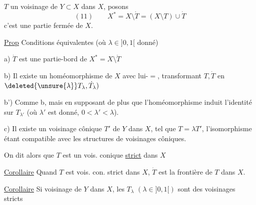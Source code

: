  $T$ un voisinage
 de $Y\subset X$
dans $X$, posons
\[
(11)\qquad X^*=X\setminus\mathring T=(X\setminus T)\cup\dot T
\]
c'est une partie fermée de $X$. 

\uline{Prop} Conditions équivalentes (où $\lambda\in]0,1[$ donné)

a) $\dot T$ est une partie-bord de $X^*=X\setminus\mathring T$

b) Il existe un homéomorphisme de $X$
avec lui-$=$, transformant $T,\dot T$ en
$\deleted{\unsure{\lambda}}T_\lambda,\dot T_\lambda)$

b') Comme b, mais en supposant de plus
que l'homéomorphisme induit l'identité
sur $T_{\lambda'}$ (où 
$\lambda'$ est donné, $0<\lambda'<\lambda$).

c) Il existe un voisinage  cônique $T'$
de $Y$ dans $X$,  tel que $T=\lambda T'$,
l'isomorphisme étant compatible avec les
structures de voisinages côniques.

On dit alors que $T$ est un vois.  conique
\uline{strict} dans $X$


\uline{Corollaire} Quand $T$ est vois.  con. strict dans $X$,
$\dot T$ est la frontière de $T$ dans $X$.

\uline{Corollaire} Si 
 voisinage
 de $Y$
dans $X$, les $T_\lambda$ $(\lambda\in]0,1[)$ sont des voisinages
 stricts
